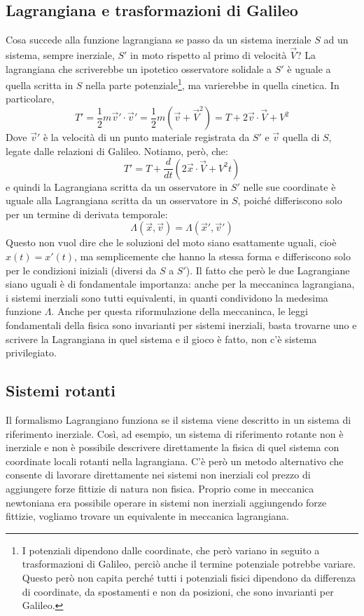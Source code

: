 \documentclass[a4paper,openany]{article}
\begin{document}
	\subsection{Lagrangiana e trasformazioni di Galileo}
	Cosa succede alla funzione lagrangiana se passo da un sistema inerziale $S$ ad un sistema, sempre inerziale, $S'$ in moto rispetto al primo di velocità $\vec{V}$? La lagrangiana che scriverebbe un ipotetico osservatore solidale a $S'$ è uguale a quella scritta in $S$ nella parte potenziale\footnote{I potenziali dipendono dalle coordinate, che però variano in seguito a trasformazioni di Galileo, perciò anche il termine potenziale potrebbe variare. Questo però non capita perché tutti i potenziali fisici dipendono da differenza di coordinate, da spostamenti e non da posizioni, che sono invarianti per Galileo.}, ma varierebbe in quella cinetica. In particolare,
	$$
	T' = \dfrac{1}{2}m\vec{v}'\cdot\vec{v}'= \dfrac{1}{2}m(\vec{v}+\vec{V}^2) = T + 2\vec{v}\cdot\vec{V}+V^{2}
	$$
	Dove $\vec{v}'$ è la velocità di un punto materiale registrata da $S'$ e $\vec{v}$ quella di $S$, legate dalle relazioni di Galileo. Notiamo, però, che:
	$$
	T' = T + \dfrac{d}{dt}(2\vec{x}\cdot\vec{V}+V^{2}t)
	$$
	e quindi la Lagrangiana scritta da un osservatore in $S'$ nelle sue coordinate è uguale alla Lagrangiana scritta da un osservatore in $S$, poiché differiscono solo per un termine di derivata temporale:
	$$
	\Lambda(\vec{x},\vec{v}) = \Lambda(\vec{x}',\vec{v}')
	$$
	Questo non vuol dire che le soluzioni del moto siano esattamente uguali, cioè $x(t) = x'(t)$, ma semplicemente che hanno la stessa forma e differiscono solo per le condizioni iniziali (diversi da $S$ a $S'$). Il fatto che però le due Lagrangiane siano uguali è di fondamentale importanza: anche per la meccaninca lagrangiana, i sistemi inerziali sono tutti equivalenti, in quanti condividono la medesima funzione $\Lambda$. Anche per questa riformulazione della meccaninca, le leggi fondamentali della fisica sono invarianti per sistemi inerziali, basta trovarne uno e scrivere la Lagrangiana in quel sistema e il gioco è fatto, non c'è sistema privilegiato.
	\subsection{Sistemi rotanti}
	Il formalismo Lagrangiano funziona se il sistema viene descritto in un sistema di riferimento inerziale. Così, ad esempio, un sistema di riferimento rotante non è inerziale e non è possibile descrivere direttamente la fisica di quel sistema con coordinate locali rotanti nella lagrangiana. C'è però un metodo alternativo che consente di lavorare direttamente nei sistemi non inerziali col prezzo di aggiungere forze fittizie di natura non fisica. Proprio come in meccanica newtoniana era possibile operare in sistemi non inerziali aggiungendo forze fittizie, vogliamo trovare un equivalente in meccanica lagrangiana.
	
\end{document}
